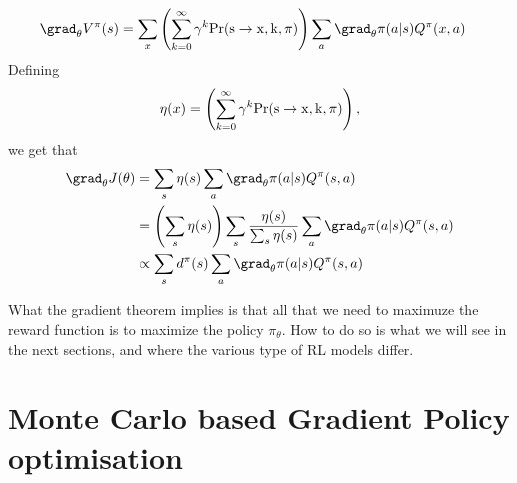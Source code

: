 \begin{tcolorbox}[title= Proof of the Gradient Theorem, height = \textheight, breakable]
    \begin{align}
        \grad_{\theta} V^{\pi}(s) &=  \sum_{x} \left(\sum^{\infty}_{k=0} \gamma^k\rm{Pr}(s\rightarrow x,k,\pi)\right) \sum_{a} \grad_{\theta} \pi(a|s) Q^{\pi}(x,a)
    \end{align} 
    Defining 
    \begin{align}
        \eta(x) =\left(\sum^{\infty}_{k=0} \gamma^k\rm{Pr}(s\rightarrow x,k,\pi)\right),
    \end{align}
    \clearpage
    we get that 
    \begin{align}
        \grad_{\theta} J(\theta) &= \sum_{s} \eta(s) \sum_{a} \grad_{\theta} \pi(a|s) Q^{\pi}(s,a) \\
        &=\left(\sum_{s}\eta(s)\right)\sum_{s} \frac{\eta(s)}{\sum_{s}\eta(s)} \sum_{a} \grad_{\theta} \pi(a|s) Q^{\pi}(s,a) \\
        &\propto \sum_{s} d^{\pi}(s) \sum_{a} \grad_{\theta} \pi(a|s) Q^{\pi}(s,a)  
    \end{align}
\end{tcolorbox}
What the gradient theorem implies is that all that we need to maximuze the reward function is to maximize the policy $\pi_{\theta}$. How to do so is what we will see in the next sections, and where the various type of RL models differ.
\section{Monte Carlo based Gradient Policy optimisation}

